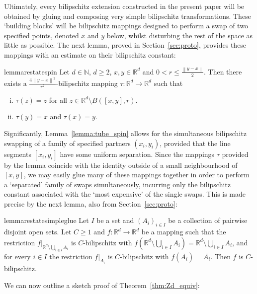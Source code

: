 \documentclass[a4paper, bibliography=totoc]{scrartcl}
\numberwithin{claimcounter}{define}
\newcommand{\R}{\mathbb{R}}
\newcommand{\N}{\mathbb{N}}
\newcommand{\enorm}[1]{\left\|#1\right\|}
\newcommand{\br}[1]{\left(#1\right)}
\newcommand{\cl}[1]{\overline{#1}}
\begin{document}
Ultimately, every bilipschitz extension constructed in the present paper will be obtained by gluing and composing very simple bilipschitz transformations. These `building blocks' will be bilipschitz mappings designed to perform a swap of two specified points, denoted $x$ and $y$ below, whilst disturbing the rest of the space as little as possible. The next lemma, proved in Section~\ref{sec:proto}, provides these mappings with an estimate on their bilipschitz constant: 
\begin{restatable*}{lemma}{restatespin}\label{lemma:tube_spin}
	Let $d\in\N$, $d\geq 2$, $x,y\in\R^{d}$ and $0< r\leq \frac{\enorm{y-x}}{2}$. Then there exists a $\frac{4\enorm{y-x}^{2}}{r^{2}}$-bilipschitz mapping $\tau\colon \R^{d}\to \R^{d}$ such that
	\begin{enumerate}[(i)]
		\item\label{tau1} $\tau(z)=z$ for all $z\in \R^{d}\setminus B([x,y],r)$.
		\item\label{tau2} $\tau(y)=x$ and $\tau(x)=y$.
	\end{enumerate}
\end{restatable*}
Significantly, Lemma~\ref{lemma:tube_spin} allows for the simultaneous bilipschitz swapping of a family of specified partners $(x_{i},y_{i})$, provided that the line segments $[x_{i},y_{i}]$ have some uniform separation. Since the mappings $\tau$ provided by the lemma coincide with the identity outside of a small neighbourhood of $[x,y]$, we may easily glue many of these mappings together in order to perform a `separated' family of swaps simultaneously, incurring only the bilipschitz constant associated with the `most expensive' of the single swaps. This is made precise by the next lemma, also from Section~\ref{sec:proto}:
\begin{restatable*}{lemma}{restatesimpleglue}\label{lemma:simple_gluing}
	Let $I$ be a set and $(A_{i})_{i\in I}$ be a collection of pairwise disjoint open sets. Let $C\geq 1$ and $f\colon \R^{d}\to \R^{d}$ be a mapping such that the restriction $f|_{\R^{d}\setminus \bigcup_{i\in I}A_{i}}$ is $C$-bilipschitz with $f\br{\R^{d}\setminus \bigcup_{i\in I}A_{i}}=\R^{d}\setminus \bigcup_{i\in I}A_{i}$, and for every $i\in I$ the restriction $f|_{\cl{A_{i}}}$ is $C$-bilipschitz with $f(\cl{A_i})=\cl{A_i}$. Then $f$ is $C$-bilipschitz. 
\end{restatable*}
We can now outline a sketch proof of Theorem~\ref{thm:Zd_equiv}:
\end{document}

